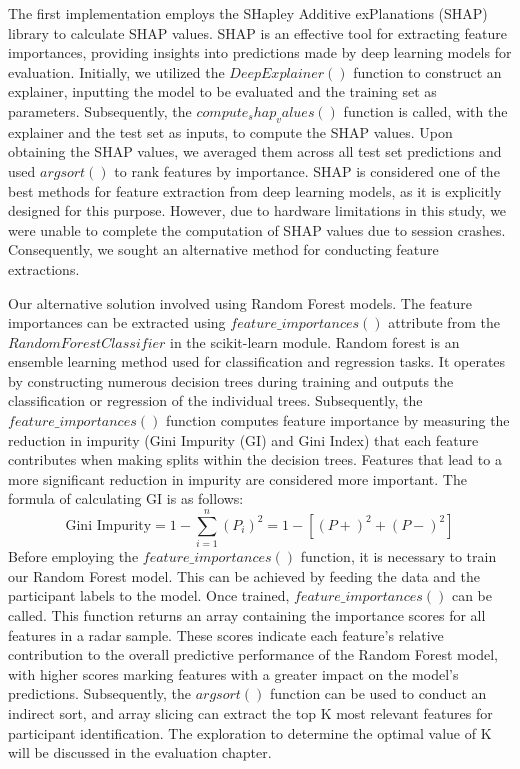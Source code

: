 \documentclass{l4proj}
\begin{document}
The first implementation employs the SHapley Additive exPlanations (SHAP) library to calculate SHAP values. SHAP is an effective tool for extracting feature importances, providing insights into predictions made by deep learning models for evaluation. Initially, we utilized the $DeepExplainer()$ function to construct an explainer, inputting the model to be evaluated and the training set as parameters. Subsequently, the $compute_shap_values()$ function is called, with the explainer and the test set as inputs, to compute the SHAP values. Upon obtaining the SHAP values, we averaged them across all test set predictions and used $argsort()$ to rank features by importance. SHAP is considered one of the best methods for feature extraction from deep learning models, as it is explicitly designed for this purpose. However, due to hardware limitations in this study, we were unable to complete the computation of SHAP values due to session crashes. Consequently, we sought an alternative method for conducting feature extractions.

Our alternative solution involved using Random Forest models. The feature importances can be extracted using $feature\_importances()$ attribute from the $RandomForestClassifier$ in the scikit-learn module. Random forest is an ensemble learning method used for classification and regression tasks. It operates by constructing numerous decision trees during training and outputs the classification or regression of the individual trees. Subsequently, the $feature\_importances()$ function computes feature importance by measuring the reduction in impurity (Gini Impurity (GI) and Gini Index) that each feature contributes when making splits within the decision trees. Features that lead to a more significant reduction in impurity are considered more important. The formula of calculating GI is as follows:
\begin{equation}
    \text{Gini Impurity} = 1 - \sum_{i=1}^{n} (P_i)^2 = 1 - [(P+)^2 + (P-)^2]
\end{equation}
Before employing the $feature\_importances()$ function, it is necessary to train our Random Forest model. This can be achieved by feeding the data and the participant labels to the model. Once trained, $feature\_importances()$ can be called. This function returns an array containing the importance scores for all features in a radar sample. These scores indicate each feature's relative contribution to the overall predictive performance of the Random Forest model, with higher scores marking features with a greater impact on the model's predictions. Subsequently, the $argsort()$ function can be  used to conduct an indirect sort, and array slicing can extract the top K most relevant features for participant identification. The exploration to determine the optimal value of K will be discussed in the evaluation chapter.
\end{document}
